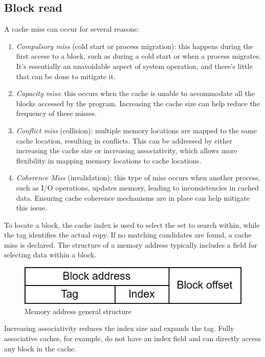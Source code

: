 \subsection{Block read}
A cache miss can occur for several reasons:
\begin{enumerate}
    \item \textit{Compulsory miss} (cold start or process migration): this happens during the first access to a block, such as during a cold start or when a process migrates. 
        It's essentially an unavoidable aspect of system operation, and there's little that can be done to mitigate it.
    \item \textit{Capacity miss}: this occurs when the cache is unable to accommodate all the blocks accessed by the program. 
        Increasing the cache size can help reduce the frequency of these misses.
    \item \textit{Conflict miss} (collision): multiple memory locations are mapped to the same cache location, resulting in conflicts.
        This can be addressed by either increasing the cache size or increasing associativity, which allows more flexibility in mapping memory locations to cache locations.
    \item \textit{Coherence Miss} (invalidation): this type of miss occurs when another process, such as I/O operations, updates memory, leading to inconsistencies in cached data. 
        Ensuring cache coherence mechanisms are in place can help mitigate this issue.
\end{enumerate}
To locate a block, the cache index is used to select the set to search within, while the tag identifies the actual copy. 
If no matching candidates are found, a cache miss is declared.
The structure of a memory address typically includes a field for selecting data within a block.
\begin{figure}[H]
    \centering
    \includegraphics[width=0.5\linewidth]{images/address.png}
    \caption{Memory address general structure}
\end{figure}
Increasing associativity reduces the index size and expands the tag. 
Fully associative caches, for example, do not have an index field and can directly access any block in the cache.

